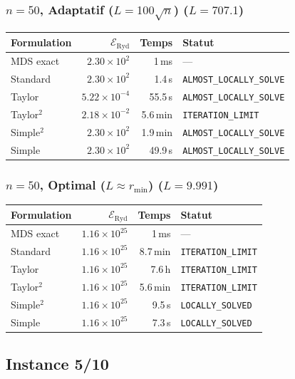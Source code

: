 \subsubsection{$n=50$, Adaptatif ($L{=}100\sqrt{n}$) ($L=707.1$)}
\begin{longtable}{@{}lrrl@{}}
  \toprule
  Formulation & $\mathcal{E}_{\mathrm{Ryd}}$ & Temps & Statut \\
  \midrule
  \endhead
  MDS exact & $2.30\times10^{2}$ & 1\,ms & --- \\
  Standard & $2.30\times10^{2}$ & 1.4\,s & \texttt{ALMOST\_LOCALLY\_SOLVE} \\
  Taylor & $5.22\times10^{-4}$ & 55.5\,s & \texttt{ALMOST\_LOCALLY\_SOLVE} \\
  Taylor$^2$ & $2.18\times10^{-2}$ & 5.6\,min & \texttt{ITERATION\_LIMIT} \\
  Simple$^2$ & $2.30\times10^{2}$ & 1.9\,min & \texttt{ALMOST\_LOCALLY\_SOLVE} \\
  Simple & $2.30\times10^{2}$ & 49.9\,s & \texttt{ALMOST\_LOCALLY\_SOLVE} \\
  \bottomrule
\end{longtable}

\subsubsection{$n=50$, Optimal ($L{\approx}r_{\min}$) ($L=9.991$)}
\begin{longtable}{@{}lrrl@{}}
  \toprule
  Formulation & $\mathcal{E}_{\mathrm{Ryd}}$ & Temps & Statut \\
  \midrule
  \endhead
  MDS exact & $1.16\times10^{25}$ & 1\,ms & --- \\
  Standard & $1.16\times10^{25}$ & 8.7\,min & \texttt{ITERATION\_LIMIT} \\
  Taylor & $1.16\times10^{25}$ & 7.6\,h & \texttt{ITERATION\_LIMIT} \\
  Taylor$^2$ & $1.16\times10^{25}$ & 5.6\,min & \texttt{ITERATION\_LIMIT} \\
  Simple$^2$ & $1.16\times10^{25}$ & 9.5\,s & \texttt{LOCALLY\_SOLVED} \\
  Simple & $1.16\times10^{25}$ & 7.3\,s & \texttt{LOCALLY\_SOLVED} \\
  \bottomrule
\end{longtable}

\subsection{Instance 5/10}
